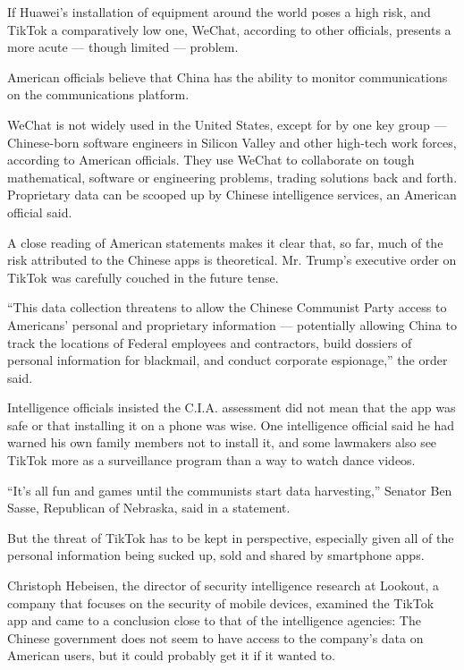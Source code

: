 If Huawei's installation of equipment around the world poses a high
risk, and TikTok a comparatively low one, WeChat, according to other
officials, presents a more acute --- though limited --- problem.

American officials believe that China has the ability to monitor
communications on the communications platform.

WeChat is not widely used in the United States, except for by one key
group --- Chinese-born software engineers in Silicon Valley and other
high-tech work forces, according to American officials. They use WeChat
to collaborate on tough mathematical, software or engineering problems,
trading solutions back and forth. Proprietary data can be scooped up by
Chinese intelligence services, an American official said.

A close reading of American statements makes it clear that, so far, much
of the risk attributed to the Chinese apps is theoretical. Mr. Trump's
executive order on TikTok was carefully couched in the future tense.

``This data collection threatens to allow the Chinese Communist Party
access to Americans' personal and proprietary information ---
potentially allowing China to track the locations of Federal employees
and contractors, build dossiers of personal information for blackmail,
and conduct corporate espionage,'' the order said.

Intelligence officials insisted the C.I.A. assessment did not mean that
the app was safe or that installing it on a phone was wise. One
intelligence official said he had warned his own family members not to
install it, and some lawmakers also see TikTok more as a surveillance
program than a way to watch dance videos.

``It's all fun and games until the communists start data harvesting,''
Senator Ben Sasse, Republican of Nebraska, said in a statement.

But the threat of TikTok has to be kept in perspective, especially given
all of the personal information being sucked up, sold and shared by
smartphone apps.

Christoph Hebeisen, the director of security intelligence research at
Lookout, a company that focuses on the security of mobile devices,
examined the TikTok app and came to a conclusion close to that of the
intelligence agencies: The Chinese government does not seem to have
access to the company's data on American users, but it could probably
get it if it wanted to.

